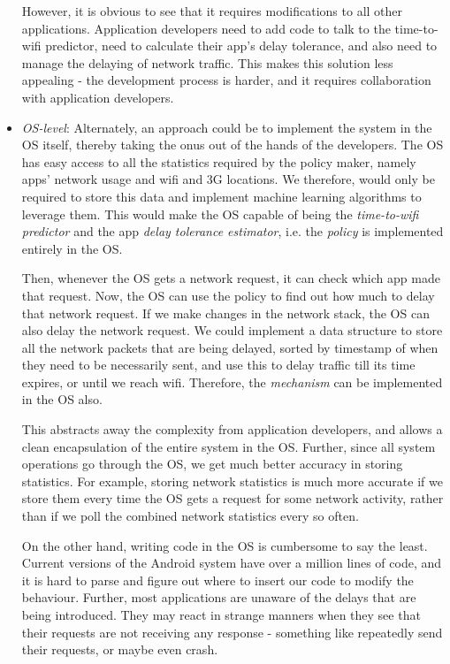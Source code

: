 \documentclass[12pt, fleqn]{article}
\begin{document}
\begin{itemize}
  However, it is obvious to see that it requires modifications to all other applications.
  Application developers need to add code to talk to the time-to-wifi predictor,
  need to calculate their app's delay tolerance, and also need to manage the 
  delaying of network traffic. This makes this solution less appealing - 
  the development process is harder, and it requires collaboration with application 
  developers. 
 
    \item \emph{OS-level}: 
    Alternately, an approach could be to implement the system in the OS itself, thereby 
  taking the onus out of the hands of the developers. The OS has easy access to 
  all the statistics required by the policy maker, namely apps' network usage and wifi 
  and 3G locations. We therefore, would only be required to store this data and 
  implement machine learning algorithms to leverage them. This would make the OS 
  capable of being the \emph{time-to-wifi predictor} and the app \emph{delay tolerance 
  estimator}, i.e. the \emph{policy} is implemented entirely in the OS.
  
  Then, whenever the OS gets a network request, it can check which app made that 
  request. Now, the OS can use the policy to find out how much to delay that 
  network request. If we make changes in the network stack, 
  the OS can also delay the network request. We could implement a 
  data structure to store all the network packets that are being delayed, sorted 
  by timestamp of when they need to be necessarily sent, and use this to delay 
  traffic till its time expires, or until we reach wifi.
  Therefore, the \emph{mechanism} can be implemented in the OS also.
  
  This abstracts away the complexity from application developers, and allows a 
  clean encapsulation of the entire system in the OS. Further, since all system 
  operations go through the OS, we get much better accuracy in storing 
  statistics. For example, storing network statistics is much more accurate if 
  we store them every time the OS gets a request for some network activity, 
  rather than if we poll the combined network statistics every so often. 
    
  On the other hand, writing code in the OS is cumbersome to say the least. 
  Current versions of the Android system have over a million lines of code, and 
  it is hard to parse and figure out where to insert our code to modify the 
  behaviour. Further, most applications are unaware of the delays that are 
  being introduced. They may 
  react in strange manners when they see that their requests are not receiving 
  any response - something like repeatedly send their requests, or 
  maybe even crash.
  
\end{itemize}  
\end{document}
